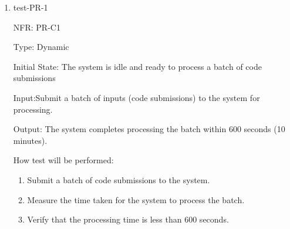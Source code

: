 \documentclass[12pt, titlepage]{article}
\begin{document}
\begin{enumerate}
  \item{test-PR-1}
  
  NFR: PR-C1

  Type: Dynamic

  Initial State: The system is idle and ready to process a batch of code submissions

  Input:Submit a batch of inputs (code submissions) to the system for processing.

  Output: The system completes processing the batch within 600 seconds (10 minutes).

  How test will be performed:

  \begin{enumerate}
    \item Submit a batch of code submissions to the system.
    \item Measure the time taken for the system to process the batch.
    \item Verify that the processing time is less than 600 seconds.
  \end{enumerate}
\end{enumerate}
\end{document}
